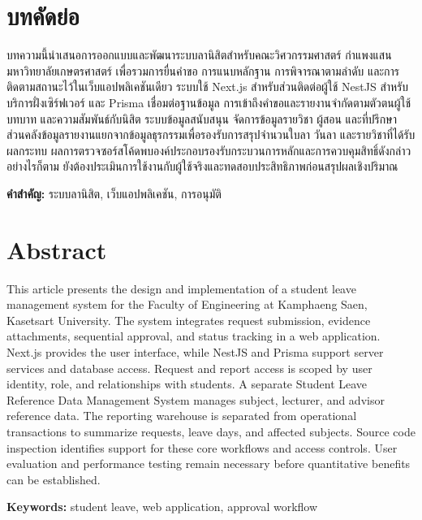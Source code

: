 \section*{บทคัดย่อ}
บทความนี้นำเสนอการออกแบบและพัฒนาระบบลานิสิตสำหรับคณะวิศวกรรมศาสตร์ กำแพงแสน มหาวิทยาลัยเกษตรศาสตร์ เพื่อรวมการยื่นคำขอ การแนบหลักฐาน การพิจารณาตามลำดับ และการติดตามสถานะไว้ในเว็บแอปพลิเคชันเดียว ระบบใช้ Next.js สำหรับส่วนติดต่อผู้ใช้ NestJS สำหรับบริการฝั่งเซิร์ฟเวอร์ และ Prisma เชื่อมต่อฐานข้อมูล การเข้าถึงคำขอและรายงานจำกัดตามตัวตนผู้ใช้ บทบาท และความสัมพันธ์กับนิสิต ระบบข้อมูลสนับสนุน จัดการข้อมูลรายวิชา ผู้สอน และที่ปรึกษา ส่วนคลังข้อมูลรายงานแยกจากข้อมูลธุรกรรมเพื่อรองรับการสรุปจำนวนใบลา วันลา และรายวิชาที่ได้รับผลกระทบ ผลการตรวจซอร์สโค้ดพบองค์ประกอบรองรับกระบวนการหลักและการควบคุมสิทธิ์ดังกล่าว อย่างไรก็ตาม ยังต้องประเมินการใช้งานกับผู้ใช้จริงและทดสอบประสิทธิภาพก่อนสรุปผลเชิงปริมาณ
\par\noindent\textbf{คำสำคัญ:} ระบบลานิสิต, เว็บแอปพลิเคชัน, การอนุมัติ
\section*{Abstract}
This article presents the design and implementation of a student leave management system for the Faculty of Engineering at Kamphaeng Saen, Kasetsart University. The system integrates request submission, evidence attachments, sequential approval, and status tracking in a web application. Next.js provides the user interface, while NestJS and Prisma support server services and database access. Request and report access is scoped by user identity, role, and relationships with students. A separate Student Leave Reference Data Management System manages subject, lecturer, and advisor reference data. The reporting warehouse is separated from operational transactions to summarize requests, leave days, and affected subjects. Source code inspection identifies support for these core workflows and access controls. User evaluation and performance testing remain necessary before quantitative benefits can be established.
\par\noindent\textbf{Keywords:} student leave, web application, approval workflow
